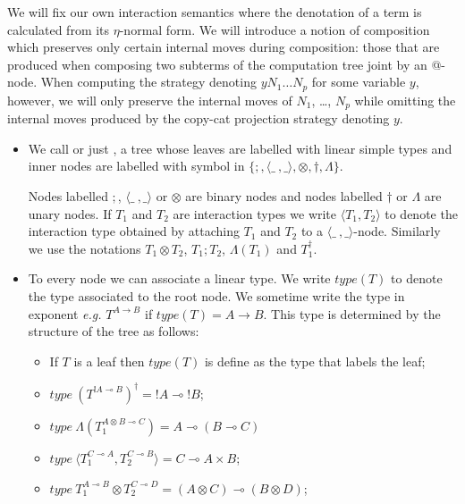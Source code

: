 We will fix our own interaction semantics where the denotation of a term is calculated from its $\eta$-normal
form. We will introduce a notion of composition which preserves only certain internal moves
during composition: those that are produced when
composing two subterms of the computation tree joint by an @-node.
When computing the strategy denoting $y N_1 \ldots
N_p$ for some variable $y$, however, we will only preserve the internal moves of
$N_1$, \ldots, $N_p$ while omitting the internal moves produced by
the copy-cat projection strategy denoting $y$.


\begin{definition} \hfill
\begin{itemize}
\item We call  or just ,
a tree whose leaves are labelled with linear simple types and
inner nodes are labelled with symbol in $\{ ;, \langle \_\ ,\_
\rangle, \otimes, \dagger, \Lambda \}$.


Nodes labelled $;$, $\langle \_\ ,\_ \rangle$ or $\otimes$ are
binary nodes and nodes labelled $\dagger$ or $\Lambda$ are unary
nodes. If $T_1$ and $T_2$ are interaction types we write
$\langle T_1, T_2 \rangle$ to denote the interaction type
obtained by attaching $T_1$ and $T_2$ to a $\langle \_\ ,\_
\rangle$-node. Similarly we use the notations $T_1 \otimes T_2$,
$T_1 ; T_2$, $\Lambda(T_1)$ and $T_1^\dagger$.

\item To every node we can associate a linear type. We write
    $type(T)$ to denote the type associated to the root node. We
    sometime write the type in exponent {\it e.g.}
    $T^{A\rightarrow B}$ if $type(T) =A\rightarrow B$. This type
    is determined by the structure of the tree as follows:
    \begin{itemize}
    \item If $T$ is a leaf then $type(T)$ is define as the type that labels the leaf;

    \item $type\ (T^{!A \multimap B})^\dagger = !A \multimap !B$;

    \item $type\ \Lambda(T_1^{A \otimes B \multimap C}) = A \multimap (B \multimap C)$

    \item $type\ \langle T_1^{C \multimap A} , T_2^{C \multimap B} \rangle =
    C \multimap A \times B$;

    \item $type\ T_1^{A \multimap B} \otimes T_2^{C \multimap D} = (A \otimes C) \multimap (B \otimes D)$;


\end{itemize}
\end{itemize}
\end{definition}
